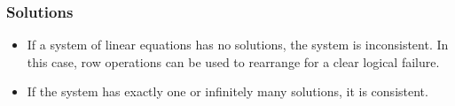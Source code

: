 \documentclass[12pt]{report}
\begin{document}
\begin{flushleft}
\subsubsection*{Solutions}

\begin{itemize}
    \item If a system of linear equations has no solutions, the system is
        inconsistent. In this case, row operations can be used to rearrange for a
        clear logical failure.
    \item If the system has exactly one or infinitely many solutions, it is
        consistent.
\end{itemize}

\end{flushleft}
\end{document}
